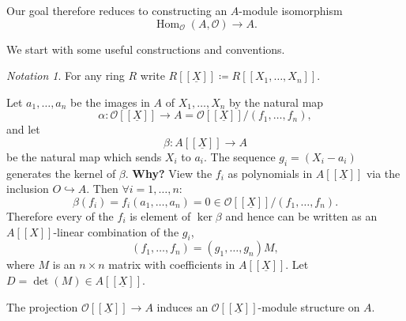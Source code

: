 \documentclass{article}
\theoremstyle{plain}%
\theoremstyle{definition}
\theoremstyle{remark}
\newtheorem*{notation}{Notation}
\renewcommand{\hom}{\operatorname{Hom}}
\begin{document}
    Our goal therefore reduces to constructing an \(A\)-module isomorphism
    \[
        \hom_\mathcal{O}(A, \mathcal{O}) \to A.
    \]

    We start with some useful constructions and conventions.
    \begin{notation}
        For any ring \(R\) write \(R[[\underline{X}]] \coloneqq R[[X_1, \dots, X_n]]\).
    \end{notation}

    Let \(a_1, \dots, a_n\) be the images in \(A\) of \(X_1, \dots, X_n\) by the natural map
    \[
        \alpha \colon \mathcal{O}[[\underline{X}]] \to A = \mathcal{O}[[\underline{X}]]/(f_1, \dots, f_n),
    \]
    and let
    \[
        \beta \colon A[[\underline{X}]] \to A  
    \]
    be the natural map which sends \(X_i\) to \(a_i\). The sequence \(g_i =  (X_i - a_i)\) 
    generates the kernel of \(\beta\). \textbf{Why?}
    View the \(f_i\) as polynomials in \(A[[\underline{X}]]\) via the inclusion \(O \hookrightarrow A\). Then \(\forall i = 1, \dots, n\colon\)
    \[
        \beta(f_i) = f_i(a_1, \dots, a_n) = 0 \in \mathcal{O}[[\underline{X}]]/(f_1, \dots, f_n).
    \]
    Therefore every of the \(f_i\) is element of \(\ker \beta\) and hence can be written as 
    an \(A[[X]]\)-linear combination of the \(g_i\),
    \[
        (f_1, \dots, f_n) = (g_1, \dots, g_n)M,  
    \]
    where \(M\) is an \(n \times n\) matrix with coefficients in \(A[[\underline{X}]]\). 
    Let \(D = \det(M) \in A[[\underline{X}]]\).
    

    The projection \(\mathcal{O}[[\underline{X}]] \to A\) induces an \(\mathcal{O}[[\underline{X}]]\)-module 
    structure on \(A\).
\end{document}
